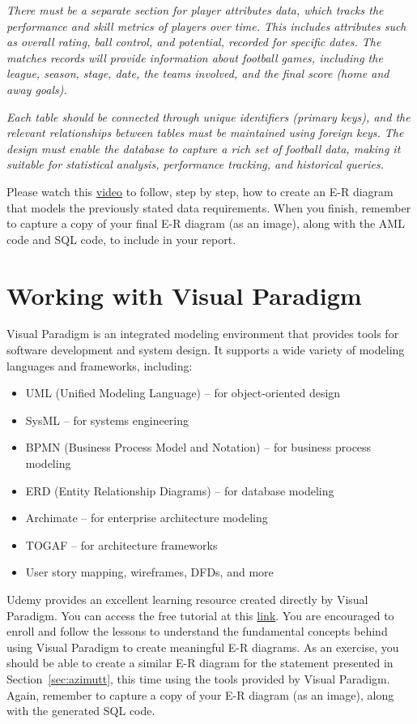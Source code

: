 \documentclass{article}
\begin{document}
\textit{There must be a separate section for player attributes data, which tracks the performance and skill metrics of players over time. This includes attributes such as overall rating, ball control, and potential, recorded for specific dates. The matches records will provide information about football games, including the league, season, stage, date, the teams involved, and the final score (home and away goals).}

\textit{Each table should be connected through unique identifiers (primary keys), and the relevant relationships between tables must be maintained using foreign keys. The design must enable the database to capture a rich set of football data, making it suitable for statistical analysis, performance tracking, and historical queries.}

Please watch this \href{https://drive.google.com/file/d/1e4SKyzVyXFkjLNyx0BBZxJIGoPUVN3d2/view?usp=sharing}{video} to follow, step by step, how to create an E-R diagram that models the previously stated data requirements. When you finish, remember to capture a copy of your final E-R diagram (as an image), along with the AML code and SQL code, to include in your report.

\section{Working with Visual Paradigm} \label{sec:visual}
Visual Paradigm is an integrated modeling environment that provides tools for software development and system design. It supports a wide variety of modeling languages and frameworks, including:

\begin{itemize}
    \item UML (Unified Modeling Language) – for object-oriented design
    \item SysML – for systems engineering
    \item BPMN (Business Process Model and Notation) – for business process modeling
    \item ERD (Entity Relationship Diagrams) – for database modeling
    \item Archimate – for enterprise architecture modeling
    \item TOGAF – for architecture frameworks
    \item User story mapping, wireframes, DFDs, and more
\end{itemize}

Udemy provides an excellent learning resource created directly by Visual Paradigm. You can access the free tutorial at this \href{https://www.udemy.com/course/visual-paradigm-essential}{link}. You are encouraged to enroll and follow the lessons to understand the fundamental concepts behind using Visual Paradigm to create meaningful E-R diagrams. As an exercise, you should be able to create a similar E-R diagram for the statement presented in Section~\ref{sec:azimutt}, this time using the tools provided by Visual Paradigm. Again, remember to capture a copy of your E-R diagram (as an image), along with the generated SQL code.
\end{document}
